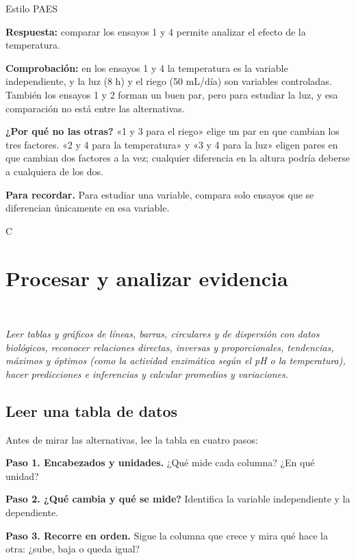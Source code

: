 \begin{elejemplo}{Estilo PAES}
{\textbf{Respuesta:} comparar los ensayos 1 y 4 permite analizar el efecto de la temperatura.

\textbf{Comprobación:} en los ensayos 1 y 4 la temperatura es la variable independiente, y la luz (8 h) y el riego (50 mL/día) son variables controladas. También los ensayos 1 y 2 forman un buen par, pero para estudiar la luz, y esa comparación no está entre las alternativas.

\textbf{¿Por qué no las otras?} «1 y 3 para el riego» elige un par en que cambian los tres factores. «2 y 4 para la temperatura» y «3 y 4 para la luz» eligen pares en que cambian dos factores a la vez; cualquier diferencia en la altura podría deberse a cualquiera de los dos.

\textbf{\color{cienciaD}Para recordar.} Para estudiar una variable, compara solo ensayos que se diferencian únicamente en esa variable.}{C}
\end{elejemplo}

\section[Procesar y analizar evidencia]{Procesar y analizar evidencia}
\modcomun\ \ {\color{gris}\itshape Leer tablas y gráficos de líneas, barras, circulares y de dispersión con datos biológicos, reconocer relaciones directas, inversas y proporcionales, tendencias, máximos y óptimos (como la actividad enzimática según el pH o la temperatura), hacer predicciones e inferencias y calcular promedios y variaciones.\par}
\subsection{Leer una tabla de datos}
Antes de mirar las alternativas, lee la tabla en cuatro pasos:

 

\textbf{Paso 1. Encabezados y unidades.} ¿Qué mide cada columna? ¿En qué unidad?

 

\textbf{Paso 2. ¿Qué cambia y qué se mide?} Identifica la variable independiente y la dependiente.

 

\textbf{Paso 3. Recorre en orden.} Sigue la columna que crece y mira qué hace la otra: ¿sube, baja o queda igual?

